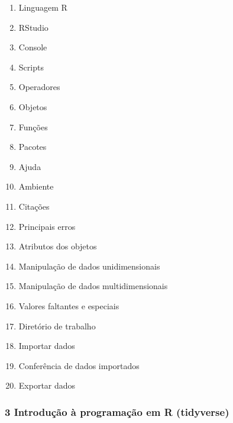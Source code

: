 \documentclass[
  letterpaper,
  DIV=11,
  numbers=noendperiod]{scrartcl}
\providecommand{\tightlist}{%
  \setlength{\itemsep}{0pt}\setlength{\parskip}{0pt}}\usepackage{longtable,booktabs,array}
\begin{document}
\begin{enumerate}
\def\labelenumi{\arabic{enumi}.}
\tightlist
\item
  Linguagem R
\item
  RStudio
\item
  Console
\item
  Scripts
\item
  Operadores
\item
  Objetos
\item
  Funções
\item
  Pacotes
\item
  Ajuda
\item
  Ambiente
\item
  Citações
\item
  Principais erros
\item
  Atributos dos objetos
\item
  Manipulação de dados unidimensionais
\item
  Manipulação de dados multidimensionais
\item
  Valores faltantes e especiais
\item
  Diretório de trabalho
\item
  Importar dados
\item
  Conferência de dados importados
\item
  Exportar dados
\end{enumerate}

\subsubsection{3 Introdução à programação em R
(tidyverse)}\label{introduuxe7uxe3o-uxe0-programauxe7uxe3o-em-r-tidyverse}
\end{document}
